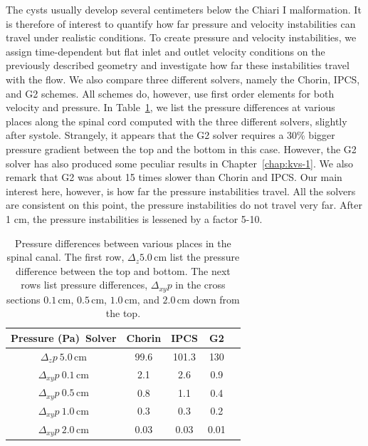 The cysts usually develop several centimeters below the Chiari I
malformation. It is therefore of interest to quantify how far pressure
and velocity instabilities can travel under realistic conditions.  To
create pressure and velocity instabilities, we assign time-dependent
but flat inlet and outlet velocity conditions on the previously
described geometry and investigate how far these instabilities travel
with the flow. We also compare three different solvers, namely the
Chorin, IPCS, and G2 schemes.  All schemes do, however, use first
order elements for both velocity and pressure. In
Table~\ref{solvers:pressurediff}, we list the pressure differences at
various places along the spinal cord computed with the three different
solvers, slightly after systole. Strangely, it appears that the G2
solver requires a 30\% bigger pressure gradient between the top and
the bottom in this case. However, the G2 solver has also produced some
peculiar results in Chapter~\ref{chap:kvs-1}. We also remark that G2
was about 15 times slower than Chorin and IPCS. Our main interest
here, however, is how far the pressure instabilities travel. All the
solvers are consistent on this point, the pressure instabilities do
not travel very far. After 1 cm, the pressure instabilities is
lessened by a factor 5-10.

\begin{table}
  \centering
  \begin{tabular}{ccccc}
    \toprule
    Pressure (Pa)\ Solver & Chorin & IPCS & G2 \\
    \midrule
    $\Delta_z p \ 5.0\,\mathrm{cm}$  & 99.6 & 101.3 & 130     \\
    $\Delta_{xy} p  \ 0.1\,\mathrm{cm}$  &  2.1 & 2.6 & 0.9     \\
    $\Delta_{xy}  p  \ 0.5\,\mathrm{cm}$  & 0.8 & 1.1 & 0.4     \\
    $\Delta_{xy}  p  \ 1.0\,\mathrm{cm}$  & 0.3 & 0.3 & 0.2     \\
    $\Delta_{xy}  p  \ 2.0\,\mathrm{cm}$  &  0.03 & 0.03 & 0.01     \\
    \bottomrule
  \end{tabular}
  \caption{Pressure differences between various places in the spinal canal.
    The first row, $\Delta_z 5.0\,\mathrm{cm}$ list the pressure difference between the
    top and bottom. The next rows list pressure differences, $\Delta_{xy}
    p$ in the cross sections $0.1\,\mathrm{cm}$, $0.5\,\mathrm{cm}$, $1.0\,\mathrm{cm}$, and $2.0\,\mathrm{cm}$ down from
    the top.}
  \label{solvers:pressurediff}
\end{table}

